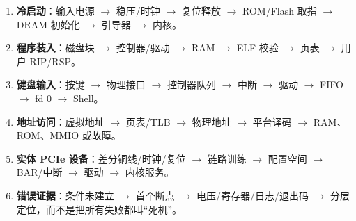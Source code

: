 \begin{enumerate}[leftmargin=2em]
  \item \textbf{冷启动}：输入电源 \(\rightarrow\) 稳压/时钟
        \(\rightarrow\) 复位释放 \(\rightarrow\) ROM/Flash 取指
        \(\rightarrow\) DRAM 初始化 \(\rightarrow\) 引导器
        \(\rightarrow\) 内核。
  \item \textbf{程序装入}：磁盘块 \(\rightarrow\) 控制器/驱动
        \(\rightarrow\) RAM \(\rightarrow\) ELF 校验
        \(\rightarrow\) 页表 \(\rightarrow\) 用户 RIP/RSP。
  \item \textbf{键盘输入}：按键 \(\rightarrow\) 物理接口
        \(\rightarrow\) 控制器队列 \(\rightarrow\) 中断
        \(\rightarrow\) 驱动 \(\rightarrow\) FIFO
        \(\rightarrow\) fd 0 \(\rightarrow\) Shell。
  \item \textbf{地址访问}：虚拟地址 \(\rightarrow\) 页表/TLB
        \(\rightarrow\) 物理地址 \(\rightarrow\) 平台译码
        \(\rightarrow\) RAM、ROM、MMIO 或故障。
  \item \textbf{实体 PCIe 设备}：差分铜线/时钟/复位
        \(\rightarrow\) 链路训练 \(\rightarrow\) 配置空间
        \(\rightarrow\) BAR/中断 \(\rightarrow\) 驱动
        \(\rightarrow\) 内核服务。
  \item \textbf{错误证据}：条件未建立 \(\rightarrow\) 首个断点
        \(\rightarrow\) 电压/寄存器/日志/退出码
        \(\rightarrow\) 分层定位，而不是把所有失败都叫“死机”。
\end{enumerate}
